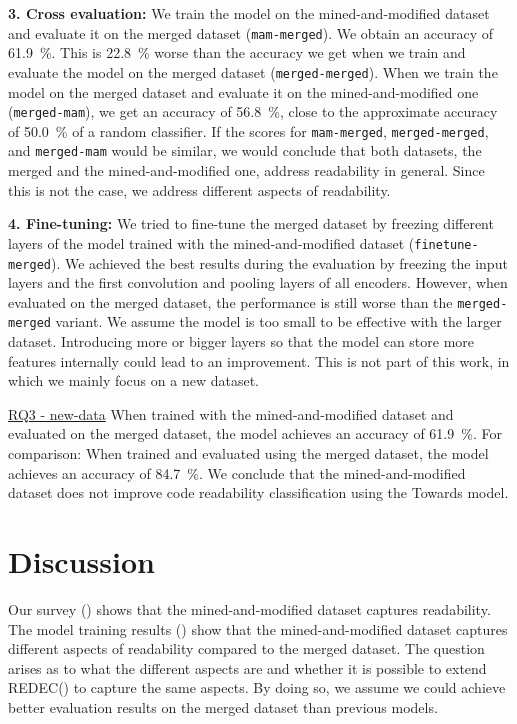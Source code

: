 \documentclass[%
class=scrreprt,
chapterprefix=false,%
open=right,%
twoside=true,%
paper=a4,%
logofile={Logo\_zentral\_farbig\_EN.png},%
thesistype=master,%
UKenglish,%
]{se2thesis}
\theoremstyle{definition}
\newcommand{\rdh}{REDEC\xspace}
\begin{document}
	\textbf{3. Cross evaluation:}
    We train the model on the mined-and-modified dataset and evaluate it on the merged dataset (\texttt{mam-merged}). We obtain an accuracy of 61.9~\%. This is 22.8~\% worse than the accuracy we get when we train and evaluate the model on the merged dataset (\texttt{merged-merged}). When we train the model on the merged dataset and evaluate it on the mined-and-modified one (\texttt{merged-mam}), we get an accuracy of 56.8~\%, close to the approximate accuracy of 50.0~\% of a random classifier.
    If the scores for \texttt{mam-merged}, \texttt{merged-merged}, and \texttt{merged-mam} would be similar, we would conclude that both datasets, the merged and the mined-and-modified one, address readability in general. Since this is not the case, we address different aspects of readability.
	
	\begin{sloppypar}
	\textbf{4. Fine-tuning:}
	We tried to fine-tune the merged dataset by freezing different layers of the model trained with the mined-and-modified dataset (\texttt{finetune-merged}). We achieved the best results during the evaluation by freezing the input layers and the first convolution and pooling layers of all encoders. 
	However, when evaluated on the merged dataset, the performance is still worse than the \texttt{merged-merged} variant.
	We assume the model is too small to be effective with the larger dataset. Introducing more or bigger layers so that the model can store more features internally could lead to an improvement. This is not part of this work, in which we mainly focus on a new dataset.
	\end{sloppypar}
	
	\begin{summary}{\hyperref[new-data]{RQ3 - new-data}}
		When trained with the mined-and-modified dataset and evaluated on the merged dataset, the model achieves an accuracy of 61.9~\%. For comparison: When trained and evaluated using the merged dataset, the model achieves an accuracy of 84.7~\%.
		We conclude that the mined-and-modified dataset does not improve code readability classification using the Towards model.
	\end{summary}
		
\chapter{Discussion} \label{Discussion}

    Our survey () shows that the mined-and-modified dataset captures readability. The model training results () show that the mined-and-modified dataset captures different aspects of readability compared to the merged dataset.  
    The question arises as to what the different aspects are and whether it is possible to extend \rdh () to capture the same aspects. By doing so, we assume we could achieve better evaluation results on the merged dataset than previous models.
	
\end{document}
